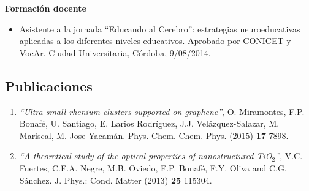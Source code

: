 \documentclass[10pt]{article}
\begin{document}
{\bf Formación docente}
 \begin{itemize}
  \item Asistente a la jornada ``Educando al Cerebro'': estrategias neuroeducativas aplicadas a los diferentes niveles educativos. Aprobado por CONICET y VocAr. Ciudad Universitaria, Córdoba, 9/08/2014.
 \end{itemize}

\subsection{Publicaciones}
\begin{enumerate}
\item{\it ``Ultra-small rhenium clusters  supported on graphene''}, O. Miramontes, F.P. Bonafé, U. Santiago, E. Larios Rodríguez, J.J. Velázquez-Salazar, M. Mariscal, M. Jose-Yacamán. Phys. Chem. Chem. Phys. (2015) {\bf 17} 7898.
\item{\it ``A theoretical study of the optical properties of nanostructured TiO$_2$''}, V.C. Fuertes, C.F.A. Negre, M.B. Oviedo, F.P. Bonaf\'e, F.Y. Oliva and C.G. S\'anchez. J. Phys.: Cond. Matter (2013) {\bf 25} 115304.
\end{enumerate}

\end{document}
